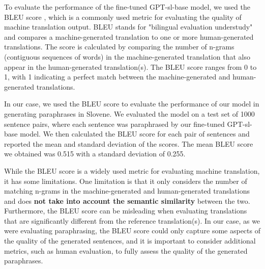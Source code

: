 \documentclass[fleqn,moreauthors,10pt]{ds_report}
\begin{document}
To evaluate the performance of the fine-tuned GPT-sl-base model, we used the BLEU score \cite{Papineni2002BleuAM}, which is a commonly used metric for evaluating the quality of machine translation output. BLEU stands for "bilingual evaluation understudy" and compares a machine-generated translation to one or more human-generated translations. The score is calculated by comparing the number of n-grams (contiguous sequences of words) in the machine-generated translation that also appear in the human-generated translation(s). The BLEU score ranges from 0 to 1, with 1 indicating a perfect match between the machine-generated and human-generated translations.

In our case, we used the BLEU score to evaluate the performance of our model in generating paraphrases in Slovene. We evaluated the model on a test set of 1000 sentence pairs, where each sentence was paraphrased by our fine-tuned GPT-sl-base model. We then calculated the BLEU score for each pair of sentences and reported the mean and standard deviation of the scores. The mean BLEU score we obtained was 0.515 with a standard deviation of 0.255.

While the BLEU score is a widely used metric for evaluating machine translation, it has some limitations. One limitation is that it only considers the number of matching n-grams in the machine-generated and human-generated translations and does \textbf{not take into account the semantic similarity} between the two. Furthermore, the BLEU score can be misleading when evaluating translations that are significantly different from the reference translation(s). In our case, as we were evaluating paraphrasing, the BLEU score could only capture some aspects of the quality of the generated sentences, and it is important to consider additional metrics, such as human evaluation, to fully assess the quality of the generated paraphrases.


\end{document}
